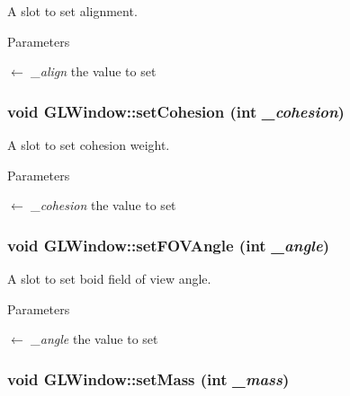 A slot to set alignment. 
\begin{DoxyParams}{Parameters}
\item[\mbox{$\leftarrow$} {\em \_\-align}]the value to set \end{DoxyParams}
\hypertarget{classGLWindow_a66839b65997f0e7d52e47714b76199d6}{
\subsubsection[{setCohesion}]{\setlength{\rightskip}{0pt plus 5cm}void GLWindow::setCohesion (int {\em \_\-cohesion})}}
\label{classGLWindow_a66839b65997f0e7d52e47714b76199d6}


A slot to set cohesion weight. 
\begin{DoxyParams}{Parameters}
\item[\mbox{$\leftarrow$} {\em \_\-cohesion}]the value to set \end{DoxyParams}
\hypertarget{classGLWindow_ad576b8165add39f4269afa6219ee70be}{
\subsubsection[{setFOVAngle}]{\setlength{\rightskip}{0pt plus 5cm}void GLWindow::setFOVAngle (int {\em \_\-angle})}}
\label{classGLWindow_ad576b8165add39f4269afa6219ee70be}


A slot to set boid field of view angle. 
\begin{DoxyParams}{Parameters}
\item[\mbox{$\leftarrow$} {\em \_\-angle}]the value to set \end{DoxyParams}
\hypertarget{classGLWindow_a25f60ebc4d0f4de2bddd3940f8b4ae13}{
\subsubsection[{setMass}]{\setlength{\rightskip}{0pt plus 5cm}void GLWindow::setMass (int {\em \_\-mass})}}
\label{classGLWindow_a25f60ebc4d0f4de2bddd3940f8b4ae13}


